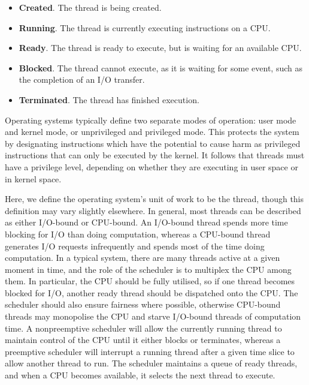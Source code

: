 \documentclass[bsc,frontabs,singlespacing,parskip,deptreport]{infthesis}     %
\begin{document}
\begin{itemize}
    \item{\textbf{Created}. The thread is being created.}
    \item{\textbf{Running}. The thread is currently executing instructions on a CPU.}
    \item{\textbf{Ready}. The thread is ready to execute, but is waiting for an available CPU.}
    \item{\textbf{Blocked}. The thread cannot execute, as it is waiting for some event, such as the completion of an I/O transfer.}
    \item{\textbf{Terminated}. The thread has finished execution.}
\end{itemize}

Operating systems typically define two separate modes of operation: user mode and kernel mode, or unprivileged and privileged mode. This protects the system by designating instructions which have the potential to cause harm as privileged instructions that can only be executed by the kernel. It follows that threads must have a privilege level, depending on whether they are executing in user space or in kernel space.

Here, we define the operating system's unit of work to be the thread, though this definition may vary slightly elsewhere. In general, most threads can be described as either I/O-bound or CPU-bound. An I/O-bound thread spends more time blocking for I/O than doing computation, whereas a CPU-bound thread generates I/O requests infrequently and spends most of the time doing computation. In a typical system, there are many threads active at a given moment in time, and the role of the scheduler is to multiplex the CPU among them. In particular, the CPU should be fully utilised, so if one thread becomes blocked for I/O, another ready thread should be dispatched onto the CPU. The scheduler should also ensure fairness where possible, otherwise CPU-bound threads may monopolise the CPU and starve I/O-bound threads of computation time. A nonpreemptive scheduler will allow the currently running thread to maintain control of the CPU until it either blocks or terminates, whereas a preemptive scheduler will interrupt a running thread after a given time slice to allow another thread to run. The scheduler maintains a queue of ready threads, and when a CPU becomes available, it selects the next thread to execute.
\end{document}
